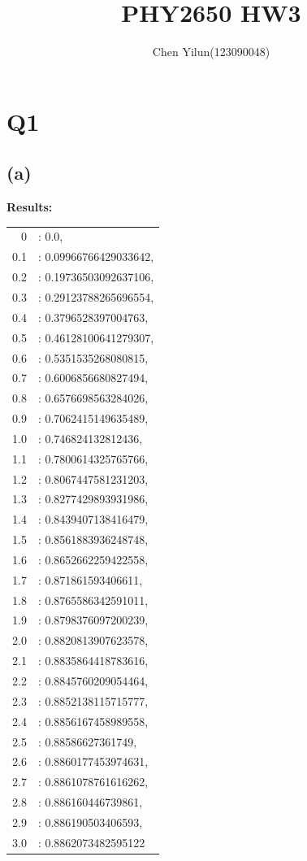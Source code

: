 \documentclass{article}
\title{PHY2650 HW3}
\author{Chen Yilun(123090048)}
\begin{document}
\maketitle


\section{Q1}
\subsection{(a)}

\textbf{Results:}
\begin{tabular}{rl}
0 & : 0.0, \\
0.1 & : 0.09966766429033642, \\
0.2 & : 0.19736503092637106, \\
0.3 & : 0.29123788265696554, \\
0.4 & : 0.3796528397004763, \\
0.5 & : 0.46128100641279307, \\
0.6 & : 0.5351535268080815, \\
0.7 & : 0.6006856680827494, \\
0.8 & : 0.6576698563284026, \\
0.9 & : 0.7062415149635489, \\
1.0 & : 0.746824132812436, \\
1.1 & : 0.7800614325765766, \\
1.2 & : 0.8067447581231203, \\
1.3 & : 0.8277429893931986, \\
1.4 & : 0.8439407138416479, \\
1.5 & : 0.8561883936248748, \\
1.6 & : 0.8652662259422558, \\
1.7 & : 0.871861593406611, \\
1.8 & : 0.8765586342591011, \\
1.9 & : 0.8798376097200239, \\
2.0 & : 0.8820813907623578, \\
2.1 & : 0.8835864418783616, \\
2.2 & : 0.8845760209054464, \\
2.3 & : 0.8852138115715777, \\
2.4 & : 0.8856167458989558, \\
2.5 & : 0.88586627361749, \\
2.6 & : 0.8860177453974631, \\
2.7 & : 0.8861078761616262, \\
2.8 & : 0.886160446739861, \\
2.9 & : 0.886190503406593, \\
3.0 & : 0.8862073482595122
\end{tabular}
\end{document}
